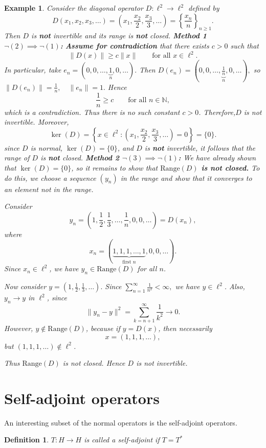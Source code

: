 \documentclass{report}
\newtheorem{defn}{Definition}
\newtheorem{exm}{Example}
\begin{document}
\begin{exm}
Consider the diagonal operator $D:\ell^2\to\ell^2$ defined by
\[
D(x_1,x_2,x_3,\dots)=\left(x_1,\frac{x_2}{2},\frac{x_3}{3},\dots\right)=\left\{\frac{x_n}{n}\right\}_{n\ge1}.
\]
Then $D$ is \textbf{not} invertible and its range is \textbf{not} closed.
\textbf{Method 1 \(\neg(2)\implies \neg(1)\):} \textbf{Assume for contradiction} that there exists $c>0$ such that
\[
\|D(x)\|\ge c\|x\| \qquad \text{for all } x\in \ell^2.
\]
In particular, take
$
e_n=(0,0,\dots,\underbrace{1}_{n},0,\dots).
$
Then
$
D(e_n)=\left(0,0,\dots,\underbrace{\frac{1}{n}}_{n},0,\dots\right),
$
so
$
\|D(e_n)\|=\frac{1}{n}, \quad \|e_n\|=1.
$
Hence
\[
\frac{1}{n}\ge c \qquad \text{for all } n\in\mathbb N,
\]
which is a contradiction. Thus there is no such constant $c>0$.
 Therefore,$D$ is not invertible.
Moreover,
\[
\ker(D)=\left\{x\in\ell^2:\left(x_1,\frac{x_2}{2},\frac{x_3}{3},\dots\right)=0\right\}=\{0\}.
\]
    since $D$ is normal, $\ker(D)=\{0\}$, and $D$ is \textbf{not} invertible, it follows that the range of $D$ is \textbf{not} closed.
\textbf{Method 2 \(\neg(3)\implies \neg(1)\):}  We have already shown that $\ker(D)=\{0\}$, so it remains to show that \textbf{$\mathrm{Range}(D)$ is not closed.} To do this, we choose a sequence $(y_n)$ in the range and show that it converges to an element not in the range.

Consider
\[
y_n=\left(1,\frac{1}{2},\frac{1}{3},\dots,\frac{1}{n},0,0,\dots\right)=D(x_n),
\]
where
\[
x_n=(\underbrace{1,1,1,\dots,1}_{\text{first } n},0,0,\dots).
\]
Since $x_n\in \ell^2$, we have $y_n\in \mathrm{Range}(D)$ for all $n$.

Now consider
$
y=\left(1,\frac{1}{2},\frac{1}{3},\dots\right).
$
Since
$
\sum_{n=1}^{\infty}\frac{1}{n^2}<\infty,
$
we have $y\in \ell^2$. Also, $y_n\to y$ in $\ell^2$, since
\[
\|y_n-y\|^2=\sum_{k=n+1}^{\infty}\frac{1}{k^2}\to 0.
\]
However, $y\notin \mathrm{Range}(D)$, because if $y=D(x)$, then necessarily
\[
x=(1,1,1,\dots),
\]
but $(1,1,1,\dots)\notin \ell^2$.

Thus $\mathrm{Range}(D)$ is not closed. Hence $D$ is not invertible.
\end{exm}

\section{Self-adjoint operators}
An interesting subset of the normal operators is the self-adjoint operators.

\begin{defn}
$T: H \rightarrow H$ is called a self-adjoint if $T=T^{*}$
\end{defn}
\end{document}
